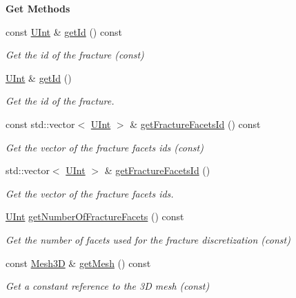 \begin{Indent}{\bf Get Methods}\par
\begin{DoxyCompactItemize}
\item 
const \hyperlink{namespaceFVCode3D_a4bf7e328c75d0fd504050d040ebe9eda}{U\+Int} \& \hyperlink{classFVCode3D_1_1Fracture3D_acf744c39ce0958b84a2ce9c09d314ec4}{get\+Id} () const 
\begin{DoxyCompactList}\small\item\em Get the id of the fracture (const) \end{DoxyCompactList}\item 
\hyperlink{namespaceFVCode3D_a4bf7e328c75d0fd504050d040ebe9eda}{U\+Int} \& \hyperlink{classFVCode3D_1_1Fracture3D_a1d629570ce5bcc0f325712fac71e244d}{get\+Id} ()
\begin{DoxyCompactList}\small\item\em Get the id of the fracture. \end{DoxyCompactList}\item 
const std\+::vector$<$ \hyperlink{namespaceFVCode3D_a4bf7e328c75d0fd504050d040ebe9eda}{U\+Int} $>$ \& \hyperlink{classFVCode3D_1_1Fracture3D_af63aa07d454891f7edaa087ade1c2135}{get\+Fracture\+Facets\+Id} () const 
\begin{DoxyCompactList}\small\item\em Get the vector of the fracture facets ids (const) \end{DoxyCompactList}\item 
std\+::vector$<$ \hyperlink{namespaceFVCode3D_a4bf7e328c75d0fd504050d040ebe9eda}{U\+Int} $>$ \& \hyperlink{classFVCode3D_1_1Fracture3D_addd7ef9cc420c38bb21d5e13405366db}{get\+Fracture\+Facets\+Id} ()
\begin{DoxyCompactList}\small\item\em Get the vector of the fracture facets ids. \end{DoxyCompactList}\item 
\hyperlink{namespaceFVCode3D_a4bf7e328c75d0fd504050d040ebe9eda}{U\+Int} \hyperlink{classFVCode3D_1_1Fracture3D_ad4591d70b2481c683707038ab0e870c9}{get\+Number\+Of\+Fracture\+Facets} () const 
\begin{DoxyCompactList}\small\item\em Get the number of facets used for the fracture discretization (const) \end{DoxyCompactList}\item 
const \hyperlink{classFVCode3D_1_1Mesh3D}{Mesh3D} \& \hyperlink{classFVCode3D_1_1Fracture3D_abfb272291358decd4671bea92f219d0a}{get\+Mesh} () const 
\begin{DoxyCompactList}\small\item\em Get a constant reference to the 3D mesh (const) \end{DoxyCompactList}\end{DoxyCompactItemize}
\end{Indent}
